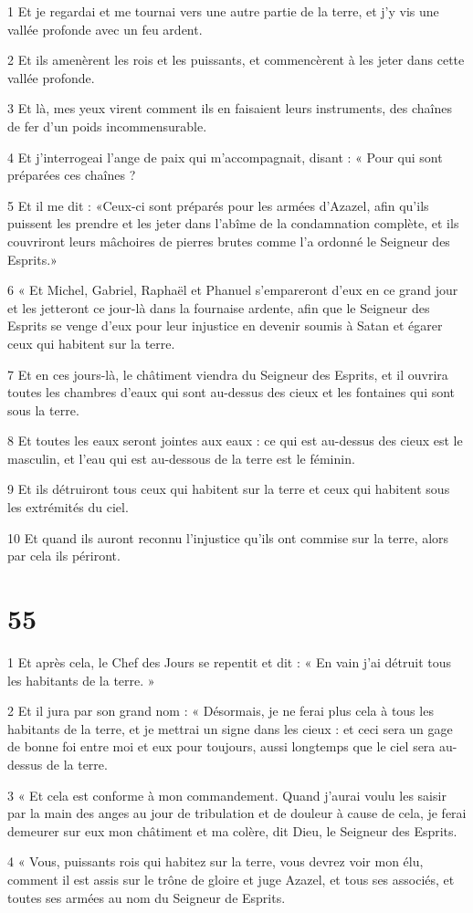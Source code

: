 \par 1 Et je regardai et me tournai vers une autre partie de la terre, et j'y vis une vallée profonde avec un feu ardent.
\par 2 Et ils amenèrent les rois et les puissants, et commencèrent à les jeter dans cette vallée profonde.
\par 3 Et là, mes yeux virent comment ils en faisaient leurs instruments, des chaînes de fer d'un poids incommensurable.
\par 4 Et j'interrogeai l'ange de paix qui m'accompagnait, disant : « Pour qui sont préparées ces chaînes ?
\par 5 Et il me dit : «Ceux-ci sont préparés pour les armées d'Azazel, afin qu'ils puissent les prendre et les jeter dans l'abîme de la condamnation complète, et ils couvriront leurs mâchoires de pierres brutes comme l'a ordonné le Seigneur des Esprits.»
\par 6 « Et Michel, Gabriel, Raphaël et Phanuel s'empareront d'eux en ce grand jour et les jetteront ce jour-là dans la fournaise ardente, afin que le Seigneur des Esprits se venge d'eux pour leur injustice en devenir soumis à Satan et égarer ceux qui habitent sur la terre.
\par 7 Et en ces jours-là, le châtiment viendra du Seigneur des Esprits, et il ouvrira toutes les chambres d'eaux qui sont au-dessus des cieux et les fontaines qui sont sous la terre.
\par 8 Et toutes les eaux seront jointes aux eaux : ce qui est au-dessus des cieux est le masculin, et l'eau qui est au-dessous de la terre est le féminin.
\par 9 Et ils détruiront tous ceux qui habitent sur la terre et ceux qui habitent sous les extrémités du ciel.
\par 10 Et quand ils auront reconnu l'injustice qu'ils ont commise sur la terre, alors par cela ils périront.

\chapter{55}

\par 1 Et après cela, le Chef des Jours se repentit et dit : « En vain j'ai détruit tous les habitants de la terre. »
\par 2 Et il jura par son grand nom : « Désormais, je ne ferai plus cela à tous les habitants de la terre, et je mettrai un signe dans les cieux : et ceci sera un gage de bonne foi entre moi et eux pour toujours, aussi longtemps que le ciel sera au-dessus de la terre.
\par 3 « Et cela est conforme à mon commandement. Quand j'aurai voulu les saisir par la main des anges au jour de tribulation et de douleur à cause de cela, je ferai demeurer sur eux mon châtiment et ma colère, dit Dieu, le Seigneur des Esprits.
\par 4 « Vous, puissants rois qui habitez sur la terre, vous devrez voir mon élu, comment il est assis sur le trône de gloire et juge Azazel, et tous ses associés, et toutes ses armées au nom du Seigneur de Esprits.


